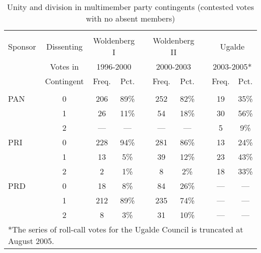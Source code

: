 \documentclass[12 pt]{article}
\begin{document}
\begin{table}
\caption{Unity and division in multimember party contingents (contested votes with no absent members)}\label{T:unidiv}
\begin{center}
\begin{tabular}{lccccccccc}
\hline\\ [-1.5ex]
Sponsor & Dissenting & \multicolumn{2}{c}{ Woldenberg I} & & \multicolumn{2}{c}{ Woldenberg II} && \multicolumn{2}{c}{Ugalde} \\
 & Votes in & \multicolumn{2}{c}{1996-2000} & & \multicolumn{2}{c}{2000-2003} && \multicolumn{2}{c}{2003-2005*} \\ \cline{3-4} \cline{6-7} \cline{9-10}
 & Contingent & Freq. & Pct. && Freq. & Pct. && Freq. & Pct.  \\
\hline \\ [-1ex]
PAN & 0 & 206 & 89\% & &252 & 82\% && 19 & 35\% \\
 &    1 &  26 & 11\% & & 54 & 18\% && 30 & 56\% \\
 &    2 & --- & ---  & &--- & ---  &&  5 &  9\% \\ [1.3ex]
PRI & 0 & 228 & 94\% & &281 & 86\% && 13 & 24\% \\
 &    1 &  13 &  5\% & & 39 & 12\% && 23 & 43\% \\
 &    2 &   2 &  1\% & &  8 &  2\% && 18 & 33\% \\ [1.3ex]
PRD & 0 &  18 &  8\% & & 84 & 26\% && --- & --- \\
 &    1 & 212 & 89\% & &235 & 74\% && --- & --- \\
 &    2 &   8 &  3\% & & 31 & 10\% && --- & --- \\
\hline
\multicolumn{10}{l}{*{\small The series of roll-call votes for the Ugalde Council is truncated at August 2005.}}
\end{tabular}
\end{center}
\end{table}
\end{document}
